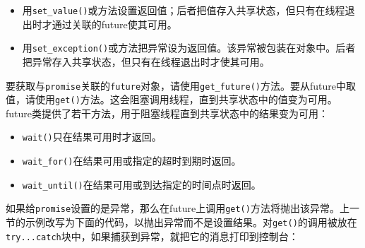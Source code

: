 \begin{itemize}
\item 用\texttt{set\_\allowbreak{}value()}或方法设置返回值；后者把值存入共享状态，但只有在线程退出时才通过关联的future使其可用。



\item 用\texttt{set\_\allowbreak{}exception()}或方法把异常设为返回值。该异常被包装在对象中。后者把异常存入共享状态，但只有在线程退出时才使其可用。

\end{itemize}



要获取与\texttt{promise}关联的\texttt{future}对象，请使用\texttt{get\_\allowbreak{}future()}方法。要从future中取值，请使用\texttt{get()}方法。这会阻塞调用线程，直到共享状态中的值变为可用。future类提供了若干方法，用于阻塞线程直到共享状态中的结果变为可用：



\begin{itemize}
\item \texttt{wait()}只在结果可用时才返回。



\item \texttt{wait\_\allowbreak{}for()}在结果可用或指定的超时到期时返回。



\item \texttt{wait\_\allowbreak{}until()}在结果可用或到达指定的时间点时返回。

\end{itemize}



如果给\texttt{promise}设置的是异常，那么在future上调用\texttt{get()}方法将抛出该异常。上一节的示例改写为下面的代码，以抛出异常而不是设置结果。对\texttt{get()}的调用被放在\texttt{try...\allowbreak{}catch}块中，如果捕获到异常，就把它的消息打印到控制台：



